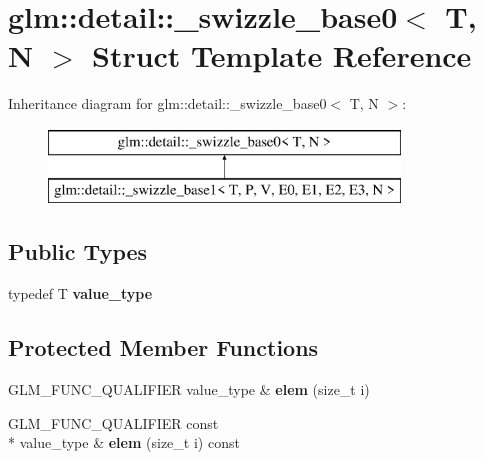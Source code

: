 \hypertarget{structglm_1_1detail_1_1__swizzle__base0}{\section{glm\-:\-:detail\-:\-:\-\_\-swizzle\-\_\-base0$<$ T, N $>$ Struct Template Reference}
\label{structglm_1_1detail_1_1__swizzle__base0}
}
Inheritance diagram for glm\-:\-:detail\-:\-:\-\_\-swizzle\-\_\-base0$<$ T, N $>$\-:\begin{figure}[H]
\begin{center}
\leavevmode
\includegraphics[height=2.000000cm]{structglm_1_1detail_1_1__swizzle__base0}
\end{center}
\end{figure}
\subsection*{Public Types}
\begin{DoxyCompactItemize}
\item 
\hypertarget{structglm_1_1detail_1_1__swizzle__base0_ad38a739e1fe6d2db2674f34c98159c8f}{typedef T {\bfseries value\-\_\-type}}\label{structglm_1_1detail_1_1__swizzle__base0_ad38a739e1fe6d2db2674f34c98159c8f}

\end{DoxyCompactItemize}
\subsection*{Protected Member Functions}
\begin{DoxyCompactItemize}
\item 
\hypertarget{structglm_1_1detail_1_1__swizzle__base0_aebd942a3c3289f9876a9ede4d710d8f0}{G\-L\-M\-\_\-\-F\-U\-N\-C\-\_\-\-Q\-U\-A\-L\-I\-F\-I\-E\-R value\-\_\-type \& {\bfseries elem} (size\-\_\-t i)}\label{structglm_1_1detail_1_1__swizzle__base0_aebd942a3c3289f9876a9ede4d710d8f0}

\item 
\hypertarget{structglm_1_1detail_1_1__swizzle__base0_a9fb7f491860415b292864d0693d8bdb8}{G\-L\-M\-\_\-\-F\-U\-N\-C\-\_\-\-Q\-U\-A\-L\-I\-F\-I\-E\-R const \\*
value\-\_\-type \& {\bfseries elem} (size\-\_\-t i) const }\label{structglm_1_1detail_1_1__swizzle__base0_a9fb7f491860415b292864d0693d8bdb8}

\end{DoxyCompactItemize}
